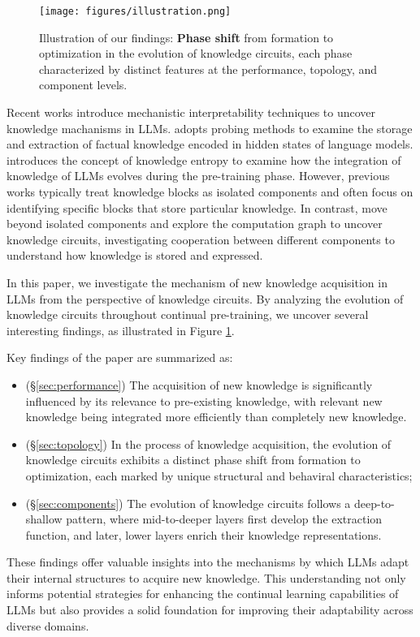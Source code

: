 \begin{figure}
    \centering
    \texttt{[image: figures/illustration.png]}
    \caption{Illustration of our findings: \textbf{Phase shift} from formation to optimization in the evolution of knowledge circuits, each phase characterized by distinct features at the performance, topology, and component levels.}
    \label{fig:illustration}
    \vspace{-10pt}
\end{figure}

Recent works introduce mechanistic interpretability techniques to uncover knowledge machanisms in LLMs.
\citet{physics3.1} adopts probing methods to examine the storage and extraction of factual knowledge encoded in hidden states of language models.
\citet{knowledge_entropy} introduces the concept of knowledge entropy to examine how the integration of knowledge of LLMs evolves during the pre-training phase.
However, previous works typically treat knowledge blocks as isolated components and often focus on identifying specific blocks that store particular knowledge.
In contrast, \citet{knowledge_circuits} move beyond isolated components and explore the computation graph to uncover knowledge circuits, investigating cooperation between different components to understand how knowledge is stored and expressed.

In this paper, we investigate the mechanism of new knowledge acquisition in LLMs from the perspective of knowledge circuits.
By analyzing the evolution of knowledge circuits throughout continual pre-training, we uncover several interesting findings, as illustrated in Figure \ref{fig:illustration}.

Key findings of the paper are summarized as:
\begin{itemize}[itemsep=0pt, topsep=5pt]
    \item (\S\ref{sec:performance}) The acquisition of new knowledge is significantly influenced by its relevance to pre-existing knowledge, with relevant new knowledge being integrated more efficiently than completely new knowledge.
    \item (\S\ref{sec:topology}) In the process of knowledge acquisition, the evolution of knowledge circuits exhibits a distinct phase shift from formation to optimization, each marked by unique structural and behaviral characteristics;
    \item (\S\ref{sec:components}) The evolution of knowledge circuits follows a deep-to-shallow pattern, where mid-to-deeper layers first develop the extraction function, and later, lower layers enrich their knowledge representations.
\end{itemize}
These findings offer valuable insights into the mechanisms by which LLMs adapt their internal structures to acquire new knowledge.
This understanding not only informs potential strategies for enhancing the continual learning capabilities of LLMs but also provides a solid foundation for improving their adaptability across diverse domains.